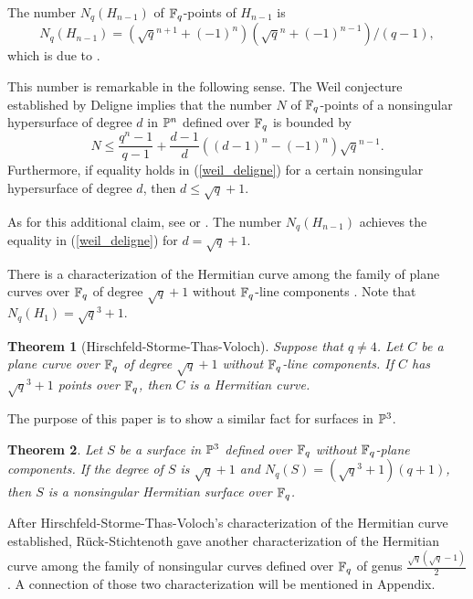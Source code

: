 \documentclass[a4paper,11pt]{article}
\newtheorem{theorem}{Theorem}[section]
\begin{document}
The number $N_q(H_{n-1})$ of ${\Bbb F}_q$-points of $H_{n-1}$ is
\begin{equation}\label{number_points_hermitian}
N_q(H_{n-1}) = (\sqrt{q}^{n+1} + (-1)^{n})(\sqrt{q}^{n} + (-1)^{n-1})/(q-1),
\end{equation}
which is due to \cite{bos-cha1966}.


This number is remarkable in the following sense.
The Weil conjecture \cite{wei1949} established by Deligne \cite{del1973}
implies that the number $N$ of ${\Bbb F}_q$-points of
a nonsingular hypersurface of degree $d$ in ${\Bbb P}^n$
defined over ${\Bbb F}_q$ is bounded by
\begin{equation}\label{weil_deligne}
N \leq \frac{q^n -1}{q-1} + 
 \frac{d-1}{d} \left( (d-1)^n - (-1)^n \right) \sqrt{q}^{n-1}.
\end{equation}
Furthermore, if equality holds in (\ref{weil_deligne})
for a certain nonsingular hypersurface of degree $d$,
then $d \leq \sqrt{q}+1$.

As for this additional claim, see \cite[Corollary 2.2]{sor1994}
or \cite[Corollary 4.3]{hom-kim2013}.
The number $N_q(H_{n-1})$
achieves the equality in (\ref{weil_deligne})
for $d=\sqrt{q} +1$.

There is a characterization of the Hermitian curve
among the family of plane curves over ${\Bbb F}_q$ of degree $\sqrt{q} +1$
without ${\Bbb F}_q$-line components \cite{hir-sto-tha-vol}.
Note that $N_q(H_{1}) = \sqrt{q}^3 +1$.
 
\begin{theorem}[Hirschfeld-Storme-Thas-Voloch]\label{hermitiancurve}
Suppose that $q \neq 4$.
Let $C$ be a plane curve over ${\Bbb F}_q$ of degree $\sqrt{q} +1$
without ${\Bbb F}_q$-line components.
If $C$ has $\sqrt{q}^3 +1$ points over ${\Bbb F}_q$,
then $C$ is a Hermitian curve.
\end{theorem}



The purpose of this paper is to show a similar fact
for surfaces in ${\Bbb P}^3$.

\begin{theorem}\label{maintheorem}
Let $S$ be a surface in ${\Bbb P}^3$
defined over ${\Bbb F}_q$ without ${\Bbb F}_q$-plane components.
If the degree of $S$ is $\sqrt{q}+1$ and
$N_q(S) = (\sqrt{q}^3+1)(q+1)$,
then $S$ is a nonsingular Hermitian surface over ${\Bbb F}_q$.
\end{theorem}

After Hirschfeld-Storme-Thas-Voloch's characterization of the Hermitian curve
established, R\"{u}ck-Stichtenoth gave another characterization 
of the Hermitian curve among
the family of nonsingular curves defined over ${\Bbb F}_q$ of genus
$\frac{\sqrt{q}(\sqrt{q}-1)}{2}$ \cite{ruc-sti1994}.
A connection of those two characterization will be mentioned in Appendix.
\end{document}
